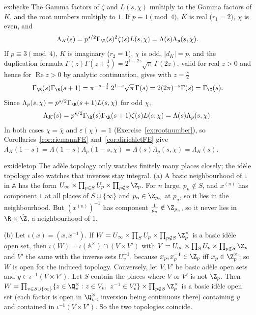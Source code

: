 \begin{solution}{ex:hecke}
\idea The Gamma factors of $\zeta$ and $L(s,\chi)$ multiply to the Gamma factors of $K$, and the root numbers multiply to $1$.
\writeup If $p\equiv1\pmod4$, $K$ is real ($r_1=2$), $\chi$ is even, and
\[
\Lambda_K(s)=p^{s/2}\Gamma_\R(s)^2\zeta(s)L(s,\chi)=\Lambda(s)\Lambda_p(s,\chi).
\] If $p\equiv3\pmod4$, $K$ is imaginary
($r_2=1$), $\chi$ is odd, $|d_K|=p$, and the duplication formula $\Gamma(z)\Gamma(z+\frac12)=2^{1-2z}\sqrt\pi\,\Gamma(2z)$, valid for real $z>0$ and hence for
$\operatorname{Re}z>0$ by analytic continuation, gives with $z=\frac s2$
\[
\Gamma_\R(s)\Gamma_\R(s+1)=\pi^{-s-\frac12}\,2^{1-s}\sqrt\pi\,\Gamma(s)=2(2\pi)^{-s}\Gamma(s)=\Gamma_\C(s).
\]
Since $\Lambda_p(s,\chi)=p^{s/2}\Gamma_\R(s+1)L(s,\chi)$ for odd $\chi$,
\[
\Lambda_K(s)=p^{s/2}\Gamma_\R(s)\Gamma_\R(s+1)\zeta(s)L(s,\chi)=\Lambda(s)\Lambda_p(s,\chi).
\]
In both cases $\chi=\overline\chi$ and $\varepsilon(\chi)=1$ (Exercise~\ref{ex:rootnumber}), so Corollaries~\ref{cor:riemannFE} and~\ref{cor:dirichletFE} give
$\Lambda_K(1-s)=\Lambda(1-s)\Lambda_p(1-s,\chi)=\Lambda(s)\Lambda_p(s,\chi)=\Lambda_K(s)$.
\end{solution}

\begin{solution}{ex:ideletop}
\idea The ad\`ele topology only watches finitely many places closely; the id\`ele topology also watches that inverses stay integral.
\writeup (a) A basic neighbourhood of $1$ in $\mathbb{A}$ has the form $U_\infty\times\prod_{p\in S}U_p\times\prod_{p\notin S}\Z_p$. For $n$ large, $p_n\notin S$, and $x^{(n)}$
has component $1$ at all places of $S\cup\{\infty\}$ and $p_n\in\Z_{p_n}$ at $p_n$, so it lies in the neighbourhood. But $(x^{(n)})^{-1}$ has component
$\frac1{p_n}\notin\Z_{p_n}$, so it never lies in $\R\times\hat{\Z}$, a neighbourhood of $1$.

(b) Let $\iota(x)=(x,x^{-1})$. If $W=U_\infty\times\prod_{S}U_p\times\prod_{p\notin S}\Z_p^\times$ is a basic id\`ele open set, then $\iota(W)=\iota(\mathbb{A}^\times)\cap(V\times V')$
with $V=U_\infty\times\prod_SU_p\times\prod_{p\notin S}\Z_p$ and $V'$ the same with the inverse sets $U_v^{-1}$, because $x_p,x_p^{-1}\in\Z_p$ iff $x_p\in\Z_p^\times$; so
$W$ is open for the induced topology. Conversely, let $V,V'$ be basic ad\`ele open sets and $y\in\iota^{-1}(V\times V')$. Let $S$ contain the places where $V$ or $V'$ is not
$\Z_p$. Then $W=\prod_{v\in S\cup\{\infty\}}\{z\in\Q_v^\times:z\in V_v,\ z^{-1}\in V'_v\}\times\prod_{p\notin S}\Z_p^\times$ is a basic id\`ele open set (each factor is open in
$\Q_v^\times$, inversion being continuous there) containing $y$ and contained in $\iota^{-1}(V\times V')$. So the two topologies coincide.
\end{solution}

